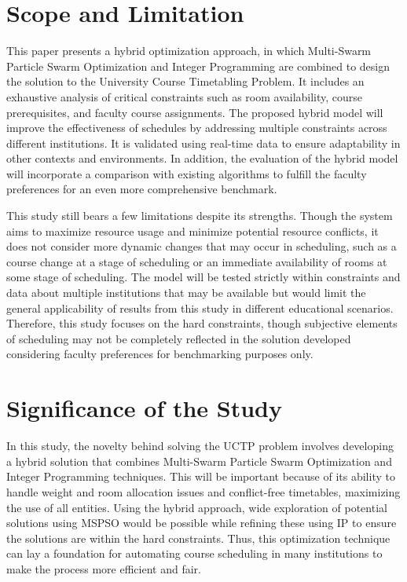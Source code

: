 \documentclass{article}
\begin{document}
\section{Scope and Limitation}
\label{sec:scopeandlimitation}

This paper presents a hybrid optimization approach, in which Multi-Swarm Particle Swarm Optimization and Integer Programming are combined to design the solution to the University Course Timetabling Problem. It includes an exhaustive analysis of critical constraints such as room availability, course prerequisites, and faculty course assignments. The proposed hybrid model will improve the effectiveness of schedules by addressing multiple constraints across different institutions. It is validated using real-time data to ensure adaptability in other contexts and environments. In addition, the evaluation of the hybrid model will incorporate a comparison with existing algorithms to fulfill the faculty preferences for an even more comprehensive benchmark.

This study still bears a few limitations despite its strengths. Though the system aims to maximize resource usage and minimize potential resource conflicts, it does not consider more dynamic changes that may occur in scheduling, such as a course change at a stage of scheduling or an immediate availability of rooms at some stage of scheduling. The model will be tested strictly within constraints and data about multiple institutions that may be available but would limit the general applicability of results from this study in different educational scenarios. Therefore, this study focuses on the hard constraints, though subjective elements of scheduling may not be completely reflected in the solution developed considering faculty preferences for benchmarking purposes only.


\section{Significance of the Study}
\label{sec:significance}

In this study, the novelty behind solving the UCTP problem involves developing a hybrid solution that combines Multi-Swarm Particle Swarm Optimization and Integer Programming techniques. This will be important because of its ability to handle weight and room allocation issues and conflict-free timetables, maximizing the use of all entities. Using the hybrid approach, wide exploration of potential solutions using MSPSO would be possible while refining these using IP to ensure the solutions are within the hard constraints. Thus, this optimization technique can lay a foundation for automating course scheduling in many institutions to make the process more efficient and fair. 
\end{document}
